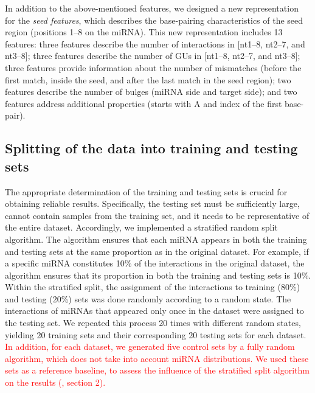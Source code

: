 \documentclass{bmcart}
\begin{document}
In addition to the above-mentioned features, we designed a new representation for the \textit{seed features}, which describes the base-pairing characteristics of the seed region (positions 1--8 on the miRNA). This new representation includes 13 features: three features describe the number of interactions in [nt1--8, nt2--7, and nt3--8]; three features describe the number of GUs in [nt1--8, nt2--7, and nt3--8]; three features provide information about the number of mismatches (before the first match, inside the seed, and after the last match in the seed region); two features describe the number of bulges (miRNA side and target side); and two features address additional properties (starts with A and index of the first base-pair).


\subsection*{Splitting of the data into training and testing sets} \label{method:split}
The appropriate determination of the training and testing sets is crucial for obtaining reliable results. Specifically, the testing set must be sufficiently large, cannot contain samples from the training set, and it needs to be representative of the entire dataset. 
Accordingly, we implemented a stratified random split algorithm. The algorithm ensures that each miRNA appears in both the training and testing sets at the same proportion as in the original dataset. For example, if a specific miRNA constitutes 10\% of the interactions in the original dataset, the algorithm ensures that its proportion in both the training and testing sets is 10\%. Within the stratified split, the assignment of the interactions to training (80\%) and testing (20\%) sets was done randomly according to a random state. The interactions of miRNAs that appeared only once in the dataset were assigned to the testing set.
We repeated this process 20 times with different random states, yielding 20 training sets and their corresponding 20 testing sets for each dataset. 
\textcolor{red}{In addition, for each dataset, we generated five control sets by a fully random algorithm, which does not take into account miRNA distributions. We used these sets as a reference baseline, to assess the influence of the stratified split algorithm on the results (, section 2). }
\end{document}
